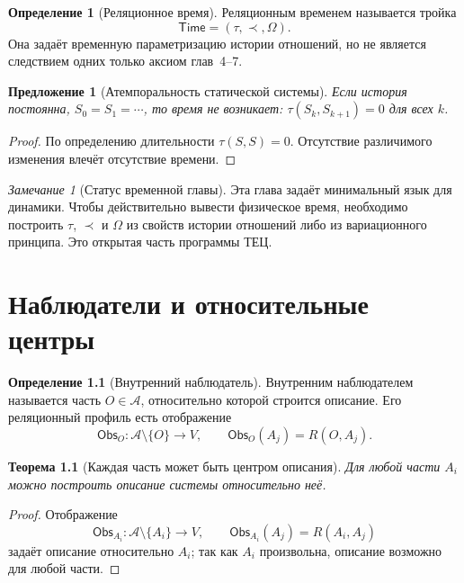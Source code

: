 \documentclass[12pt,a4paper,oneside]{book}
\theoremstyle{definition}
\newtheorem{definition}{Определение}[chapter]
\theoremstyle{plain}
\newtheorem{theorem}{Теорема}[chapter]
\newtheorem{proposition}{Предложение}[chapter]
\theoremstyle{remark}
\newtheorem{remark}{Замечание}[chapter]
\newcommand{\Parts}{\mathcal A}
\newcommand{\Rel}{R}
\newcommand{\Values}{V}
\newcommand{\State}{S}
\newcommand{\Time}{\mathsf{Time}}
\newcommand{\Observer}{\mathsf{Obs}}
\begin{document}
\begin{definition}[Реляционное время]
Реляционным временем называется тройка
\[
\Time=(\tau,\prec,\Omega).
\]
Она задаёт временную параметризацию истории отношений, но не является следствием
одних только аксиом глав~4--7.
\end{definition}

\begin{proposition}[Атемпоральность статической системы]
Если история постоянна, $\State_0=\State_1=\cdots$, то время не возникает:
$\tau(\State_k,\State_{k+1})=0$ для всех $k$.
\end{proposition}

\begin{proof}
По определению длительности $\tau(\State,\State)=0$. Отсутствие различимого изменения
влечёт отсутствие времени.
\end{proof}

\begin{remark}[Статус временной главы]
Эта глава задаёт минимальный язык для динамики. Чтобы действительно вывести
физическое время, необходимо построить $\tau$, $\prec$ и $\Omega$ из свойств истории
отношений либо из вариационного принципа. Это открытая часть программы ТЕЦ.
\end{remark}

\chapter{Наблюдатели и относительные центры}

\begin{definition}[Внутренний наблюдатель]
Внутренним наблюдателем называется часть $O\in\Parts$, относительно которой строится
описание. Его реляционный профиль есть отображение
\[
\Observer_O:\Parts\setminus\{O\}\to\Values,\qquad
\Observer_O(A_j)=\Rel(O,A_j).
\]
\end{definition}

\begin{theorem}[Каждая часть может быть центром описания]
Для любой части $A_i$ можно построить описание системы относительно неё.
\end{theorem}

\begin{proof}
Отображение
\[
\Observer_{A_i}:\Parts\setminus\{A_i\}\to\Values,\qquad
\Observer_{A_i}(A_j)=\Rel(A_i,A_j)
\]
задаёт описание относительно $A_i$; так как $A_i$ произвольна, описание возможно для
любой части.
\end{proof}
\end{document}
